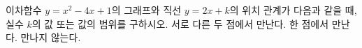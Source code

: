 이차함수 $y=x^2-4x+1$의 그래프와 직선 $y=2x+k$의 위치 관계가 다음과 같을 때, 실수 $k$의 값 또는 값의 범위를 구하시오.
 서로 다른 두 점에서 만난다.
 한 점에서 만난다.
 만나지 않는다.
